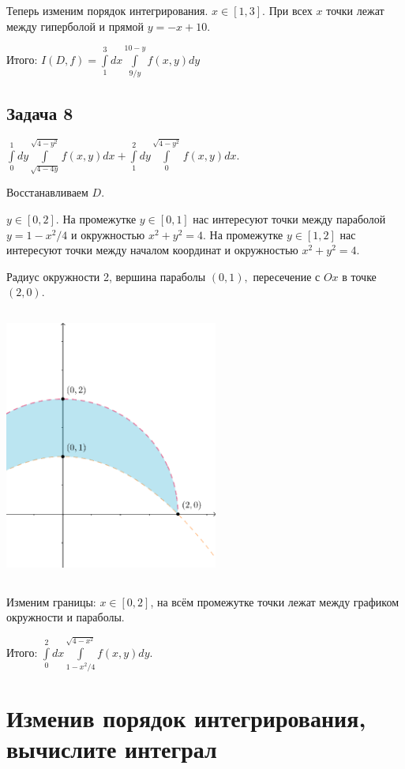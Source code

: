 \documentclass[a4paper, fleqn]{article}
\begin{document}
    Теперь изменим порядок интегрирования. $x \in [1, 3].$ При всех $x$ точки лежат между гиперболой и прямой $y = -x + 10.$
    
    Итого: $I(D, f) = \int\limits_{1}^{3} dx \int\limits_{9/y}^{10 - y} f(x, y) dy$
    
    \subsection*{Задача 8}
    
    $\displaystyle\int\limits_{0}^{1} dy \int\limits_{\sqrt{4 - 4 y}}^{\sqrt{4 - y^2}} f(x, y) dx + 
    \int\limits_{1}^{2} dy \int\limits_{0}^{\sqrt{4 - y^2}} f(x, y) dx.$

    Восстанавливаем  $D$. 
    
    $y \in [0, 2].$ На промежутке $y \in [0,1]$ нас интересуют точки между параболой $y = 1 - x^2/4$ и окружностью $x^2 + y^2 = 4.$ На промежутке $y \in [1,2]$ нас интересуют точки между началом координат и окружностью $x^2 + y^2 = 4$.
    
    Радиус окружности 2, вершина параболы $(0, 1),$ пересечение с $Ox$ в точке $(2, 0).$
    
    \includegraphics[width=7cm, height=9cm]{task 8.png}
    
    Изменим границы: $x \in [0, 2]$, на всём промежутке точки лежат между графиком окружности и параболы.
    
    
    Итого: $\displaystyle \int\limits_{0}^{2} dx \int\limits_{1 - x^2 / 4}^{\sqrt{4 - x^2}} f(x,y)dy$.
    
    \section*{Изменив порядок интегрирования, вычислите интеграл}
    
\end{document}
